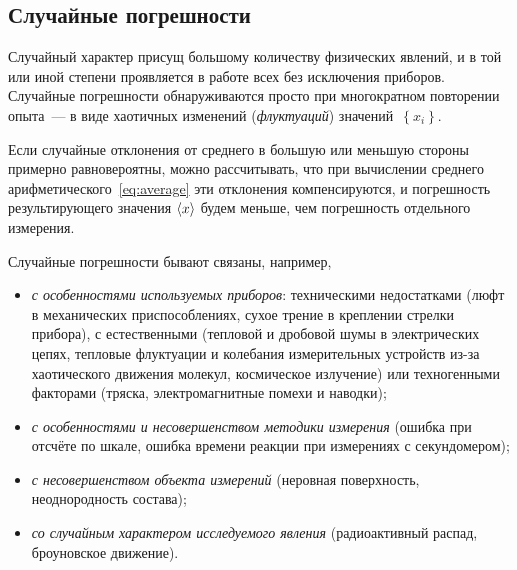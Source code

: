 
\subsection{Случайные погрешности}

Случайный характер присущ большому количеству физических
явлений, и в той или иной степени проявляется в работе всех без исключения
приборов. Случайные погрешности обнаруживаются просто при многократном
повторении опыта~--- в виде хаотичных изменений (\emph{флуктуаций})
значений~$\left\{x_{i}\right\}$.

Если случайные отклонения от среднего в большую или меньшую стороны
примерно равновероятны, можно рассчитывать, что при вычислении среднего
арифметического~\eqref{eq:average} эти отклонения компенсируются,
и погрешность результирующего значения $\left<x\right>$ будем меньше,
чем погрешность отдельного измерения.

Случайные погрешности бывают связаны, например,
\begin{itemize}\small
    \item \emph{с особенностями используемых приборов}: техническими
недостатками
(люфт в механических приспособлениях, сухое трение в креплении стрелки
прибора), с естественными (тепловой и дробовой шумы в электрических
цепях, тепловые флуктуации и колебания измерительных устройств из-за
хаотического движения молекул, космическое излучение) или техногенными
факторами (тряска, электромагнитные помехи и наводки);

    \item \emph{с особенностями и несовершенством методики измерения} (ошибка
при отсчёте по шкале, ошибка времени реакции при измерениях с секундомером);

    \item \emph{с несовершенством объекта измерений} (неровная поверхность,
неоднородность состава);

    \item \emph{со случайным характером исследуемого явления} (радиоактивный
распад, броуновское движение).
\end{itemize}

